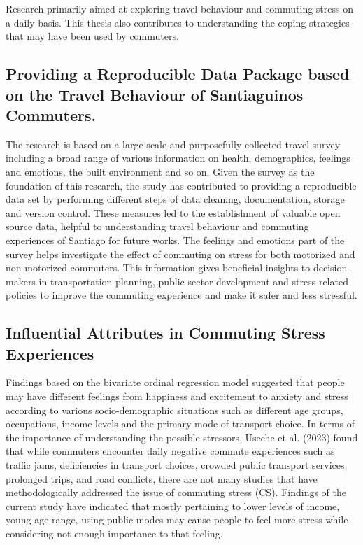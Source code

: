\documentclass[
11pt, %
oneside, %
english, %
singlespacing, %
]{macthesis} %
\begin{document}
Research primarily aimed at exploring travel behaviour and commuting stress on a daily basis. This thesis also contributes to understanding the coping strategies that may have been used by commuters.

\hypertarget{providing-a-reproducible-data-package-based-on-the-travel-behaviour-of-santiaguinos-commuters.}{%
\subsection{Providing a Reproducible Data Package based on the Travel Behaviour of Santiaguinos Commuters.}\label{providing-a-reproducible-data-package-based-on-the-travel-behaviour-of-santiaguinos-commuters.}}

The research is based on a large-scale and purposefully collected travel survey including a broad range of various information on health, demographics, feelings and emotions, the built environment and so on. Given the survey as the foundation of this research, the study has contributed to providing a reproducible data set by performing different steps of data cleaning, documentation, storage and version control. These measures led to the establishment of valuable open source data, helpful to understanding travel behaviour and commuting experiences of Santiago for future works. The feelings and emotions part of the survey helps investigate the effect of commuting on stress for both motorized and non-motorized commuters. This information gives beneficial insights to decision-makers in transportation planning, public sector development and stress-related policies to improve the commuting experience and make it safer and less stressful.

\hypertarget{influential-attributes-in-commuting-stress-experiences}{%
\subsection{Influential Attributes in Commuting Stress Experiences}\label{influential-attributes-in-commuting-stress-experiences}}

Findings based on the bivariate ordinal regression model suggested that people may have different feelings from happiness and excitement to anxiety and stress according to various socio-demographic situations such as different age groups, occupations, income levels and the primary mode of transport choice. In terms of the importance of understanding the possible stressors, Useche et al. (2023) found that while commuters encounter daily negative commute experiences such as traffic jams, deficiencies in transport choices, crowded public transport services, prolonged trips, and road conflicts, there are not many studies that have methodologically addressed the issue of commuting stress (CS). Findings of the current study have indicated that mostly pertaining to lower levels of income, young age range, using public modes may cause people to feel more stress while considering not enough importance to that feeling.
\end{document}

